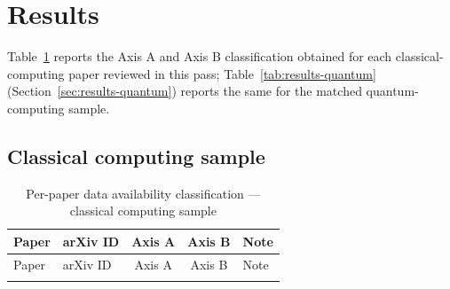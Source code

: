 \documentclass[11pt]{article}
\begin{document}
\section{Results}
\label{sec:results-detail}

Table~\ref{tab:results-cs} reports the Axis A and Axis B classification obtained for
each classical-computing paper reviewed in this pass; Table~\ref{tab:results-quantum}
(Section~\ref{sec:results-quantum}) reports the same for the matched quantum-computing
sample.

\subsection{Classical computing sample}

\begin{longtable}{@{}p{4.3cm} p{1.3cm} c c p{5.3cm}@{}}
\caption{Per-paper data availability classification --- classical computing sample} \label{tab:results-cs} \\
\toprule
Paper & arXiv ID & Axis A & Axis B & Note \\
\midrule
\endfirsthead
\toprule
Paper & arXiv ID & Axis A & Axis B & Note \\
\midrule
\endhead
\bottomrule
\endfoot


\end{longtable}
\end{document}
